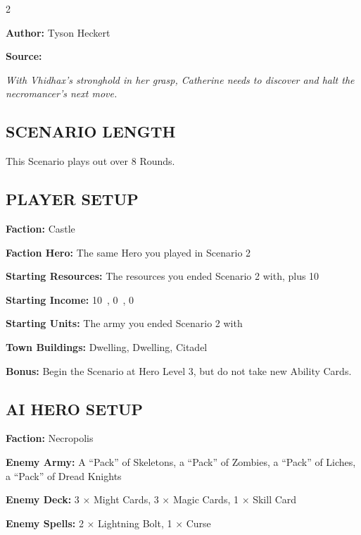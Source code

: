 
\begin{multicols*}{2}

\textbf{Author:} Tyson Heckert

\textbf{Source:} 

\textit{With Vhidhax's stronghold in her grasp, Catherine needs to discover and halt the necromancer's next move.}

\subsection*{\MakeUppercase{Scenario length}}

This Scenario plays out over 8 Rounds.

\subsection*{\MakeUppercase{Player setup}}

\textbf{Faction:} Castle

\textbf{Faction Hero:} The same Hero you played in Scenario 2

\textbf{Starting Resources:} The resources you ended Scenario 2 with, plus 10~

\textbf{Starting Income:} 10~, 0~, 0~

\textbf{Starting Units:} The army you ended Scenario 2 with

\textbf{Town Buildings:}  Dwelling,  Dwelling, Citadel

\textbf{Bonus:} Begin the Scenario at Hero Level 3, but do not take new Ability Cards.

\subsection*{\MakeUppercase{AI Hero setup}}

\textbf{Faction:} Necropolis

\textbf{Enemy Army:} A ``Pack'' of Skeletons, a ``Pack'' of Zombies, a ``Pack'' of Liches, a ``Pack'' of Dread Knights

\textbf{Enemy Deck:} 3 × Might Cards, 3 × Magic Cards, 1 × Skill Card

\textbf{Enemy Spells:} 2 × Lightning Bolt, 1 × Curse


\end{multicols*}
